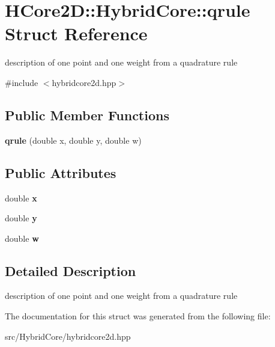 \hypertarget{structHCore2D_1_1HybridCore_1_1qrule}{}\section{H\+Core2D\+:\+:Hybrid\+Core\+:\+:qrule Struct Reference}
\label{structHCore2D_1_1HybridCore_1_1qrule}


description of one point and one weight from a quadrature rule  




{\ttfamily \#include $<$hybridcore2d.\+hpp$>$}

\subsection*{Public Member Functions}
\begin{DoxyCompactItemize}
\item 
\mbox{\label{structHCore2D_1_1HybridCore_1_1qrule_af96d3f6344cecbd1842e24697533e729}} 
{\bfseries qrule} (double x, double y, double w)
\end{DoxyCompactItemize}
\subsection*{Public Attributes}
\begin{DoxyCompactItemize}
\item 
\mbox{\label{structHCore2D_1_1HybridCore_1_1qrule_a26bda26b46fe69573fc8af3a1b497d76}} 
double {\bfseries x}
\item 
\mbox{\label{structHCore2D_1_1HybridCore_1_1qrule_a14cfb0a1edd80a5ce6b330674e841ade}} 
double {\bfseries y}
\item 
\mbox{\label{structHCore2D_1_1HybridCore_1_1qrule_a72240810f48ab2557ff0899d7515ede5}} 
double {\bfseries w}
\end{DoxyCompactItemize}


\subsection{Detailed Description}
description of one point and one weight from a quadrature rule 

The documentation for this struct was generated from the following file\+:\begin{DoxyCompactItemize}
\item 
src/\+Hybrid\+Core/hybridcore2d.\+hpp\end{DoxyCompactItemize}
